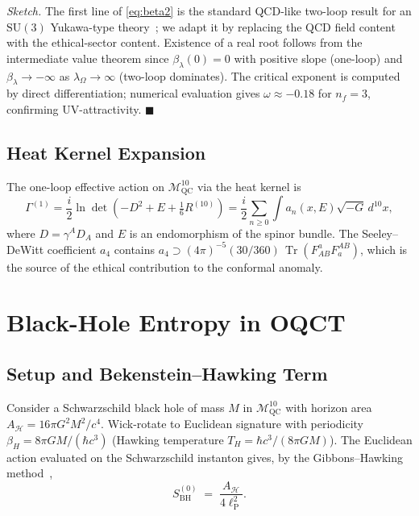 \documentclass[11pt,a4paper]{article}
\theoremstyle{myrmk}
\renewenvironment{proof}[1][\proofname]{%
  \par\noindent\textit{#1.}\enspace\ignorespaces}{\hfill$\blacksquare$\par\medskip}
\newcommand{\Mmanifold}{\mathcal{M}^{10}_{\mathrm{QC}}}
\newcommand{\lP}{\ell_{\mathrm{P}}}
\newcommand{\Tr}{\operatorname{Tr}}
\begin{document}
\begin{proof}[Sketch]
The first line of \eqref{eq:beta2} is the standard QCD-like two-loop result for an
$\mathrm{SU}(3)$ Yukawa-type theory~\cite{Machacek1983,Machacek1984}; we adapt it by
replacing the QCD field content with the ethical-sector content. Existence of a real
root follows from the intermediate value theorem since $\beta_\lambda(0)=0$ with
positive slope (one-loop) and $\beta_\lambda\to-\infty$ as $\lambda_\Omega\to\infty$
(two-loop dominates). The critical exponent is computed by direct differentiation;
numerical evaluation gives $\omega\approx-0.18$ for $n_f=3$, confirming UV-attractivity.
\end{proof}

\subsection{Heat Kernel Expansion}

The one-loop effective action on $\Mmanifold$ via the heat kernel is
\begin{equation}
  \Gamma^{(1)} = \frac{i}{2}\ln\det\!\left(-D^2+E+\tfrac{1}{6}R^{(10)}\right)
  = \frac{i}{2}\sum_{n\geq 0}\int a_n(x,E)\sqrt{-G}\,d^{10}x,
\end{equation}
where $D=\gamma^A D_A$ and $E$ is an endomorphism of the spinor bundle. The
Seeley--DeWitt coefficient $a_4$ contains
$a_4 \supset (4\pi)^{-5}(30/360)\,\Tr(F^a_{AB}F^{AB}_a)$,
which is the source of the ethical contribution to the conformal anomaly.

\section{Black-Hole Entropy in OQCT}
\label{sec:bh}

\subsection{Setup and Bekenstein--Hawking Term}

Consider a Schwarzschild black hole of mass $M$ in $\Mmanifold$ with horizon area
$A_{\mathcal{H}}=16\pi G^2 M^2/c^4$. Wick-rotate to Euclidean signature with periodicity
$\beta_H=8\pi GM/(\hbar c^3)$ (Hawking temperature $T_H=\hbar c^3/(8\pi GM)$). The
Euclidean action evaluated on the Schwarzschild instanton gives, by the
Gibbons--Hawking method~\cite{GibbonsHawking1977},
\begin{equation}
  S_{\mathrm{BH}}^{(0)} \;=\; \frac{A_{\mathcal{H}}}{4\lP^{2}}.
\end{equation}
\end{document}
